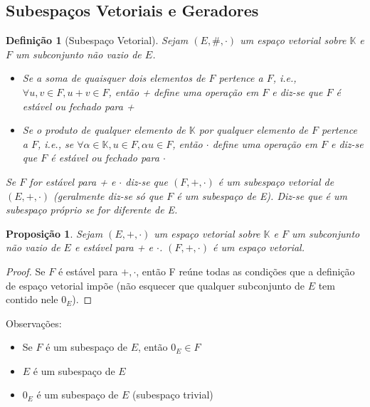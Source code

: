 \documentclass{article}
\newtheorem{proposition}{Proposição}[section]
\newtheorem{definition}{Definição}[section]
\begin{document}
\subsection{Subespaços Vetoriais e Geradores}

	\begin{definition}[Subespaço Vetorial]

Sejam $(E,\#,\cdot)$ um espaço vetorial sobre $\mathbb{K}$ e $F$ um subconjunto não vazio de $E$.
		\begin{itemize}
  			\item Se a soma de quaisquer dois elementos de $F$ pertence a $F$, i.e., $\forall u, v \in F, u+v \in F$, então + define uma operação em $F$ e diz-se que $F$ é estável ou fechado para +
  			\item Se o produto de qualquer elemento de $\mathbb{K}$ por qualquer elemento de $F$ pertence a $F$, i.e., se $\forall \alpha \in \mathbb{K}, u \in F, \alpha u \in F$, então $\cdot$ define uma operação em $F$ e diz-se que $F$ é estável ou fechado para $\cdot$
\end{itemize}
		Se $F$ for estável para + e $\cdot$ diz-se que $(F,+,\cdot)$ é um subespaço vetorial de $(E,+,\cdot)$ (geralmente diz-se só que $F$ é um subespaço de E).
Diz-se que é um subespaço próprio se for diferente de E.

	\end{definition}

	\begin{proposition}
Sejam $(E,+,\cdot)$ um espaço vetorial sobre $\mathbb{K}$ e $F$ um subconjunto não vazio de $E$ e estável para + e $\cdot$. $(F,+,\cdot)$ é um espaço vetorial.

	\end{proposition}

	\begin{proof}

	Se $F$ é estável para $+,\cdot$, então F reúne todas as condições que a definição de espaço vetorial impõe (não esquecer que qualquer subconjunto de $E$ tem contido nele $0_E$).

	\end{proof}

	Observações:
	
	\begin{itemize}
    \item Se $F$ é um subespaço de $E$, então $0_E \in F$
    \item $E$ é um subespaço de $E$
    \item ${0_E}$ é um subespaço de $E$ (subespaço trivial)
	\end{itemize}
\end{document}
